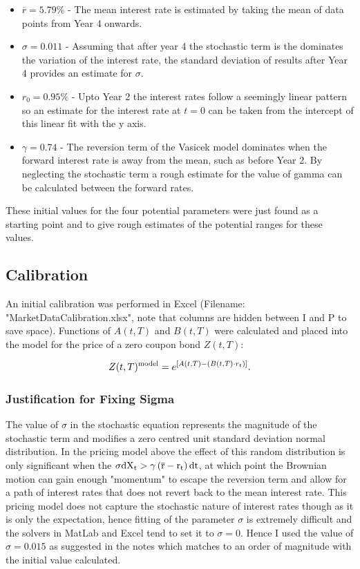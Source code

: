 \documentclass[10pt,a4paper]{article}
\theoremstyle{definition}
\theoremstyle{plain}
\theoremstyle{definition}
\theoremstyle{plain}
\newcommand{\der}{\rm{d}}
\begin{document}
\begin{itemize}{}
\item $ \overline{r}=5.79\% $ - The mean interest rate is estimated by taking the mean of data points from Year 4 onwards.
\item $\sigma=0.011$ - Assuming that after year 4 the stochastic term is the dominates the variation of the interest rate, the standard deviation of results after Year 4 provides an estimate for $\sigma$.
\item $r_0=0.95\%$ - Upto Year 2 the interest rates follow a seemingly linear pattern so an estimate for the interest rate at $t=0$ can be taken from the intercept of this linear fit with the y axis.
\item $\gamma = 0.74$ - The reversion term of the Vasicek model dominates when the forward interest rate is away from the mean, such as before Year 2. By neglecting the stochastic term a rough estimate for the value of gamma can be calculated between the forward rates.
\end{itemize}

These initial values for the four potential parameters were just found as a starting point and to give rough estimates of the potential ranges for these values.

\subsection{Calibration}

An initial calibration was performed in Excel (Filename: "MarketDataCalibration.xlsx", note that columns are hidden between I and P to save space). Functions of $A(t,T)$ and $B(t,T)$ were calculated and placed into the model for the price of a zero coupon bond $Z(t,T)$:

\begin{equation}
Z(t,T)^{\rm{model}} = e^{\left[ A(t,T)- \left( B(t,T)\cdot r_{t} \right) \right]}.
\end{equation} 

\subsubsection{Justification for Fixing Sigma}
The value of $\sigma$ in the stochastic equation represents the magnitude of the stochastic term and modifies a zero centred unit standard deviation normal distribution. In the pricing model above the effect of this random distribution is only significant when the $\sigma \der X_t > \gamma  \left( \overline{r} - r_t \right) \der t $, at which point the Brownian motion can gain enough "momentum" to escape the reversion term and allow for a path of interest rates that does not revert back to the mean interest rate. This pricing model does not capture the stochastic nature of interest rates though as it is only the expectation, hence fitting of the parameter $\sigma$ is extremely difficult and the solvers in MatLab and Excel tend to set it to $\sigma=0$. Hence I used the value of $\sigma=0.015$ as suggested in the notes which matches to an order of magnitude with the initial value calculated.
\end{document}
